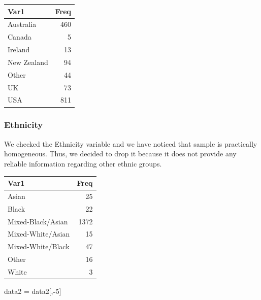 \documentclass[
]{article}
\newenvironment{Shaded}{\begin{snugshade}}{\end{snugshade}}
\newcommand{\DecValTok}[1]{\textcolor[rgb]{0.00,0.00,0.81}{#1}}
\newcommand{\KeywordTok}[1]{\textcolor[rgb]{0.13,0.29,0.53}{\textbf{#1}}}
\newcommand{\NormalTok}[1]{#1}
\newcommand{\OperatorTok}[1]{\textcolor[rgb]{0.81,0.36,0.00}{\textbf{#1}}}
\newcommand{\StringTok}[1]{\textcolor[rgb]{0.31,0.60,0.02}{#1}}
\begin{document}
\begin{longtable}[]{@{}lr@{}}
\toprule
Var1 & Freq\tabularnewline
\midrule
\endhead
Australia & 460\tabularnewline
Canada & 5\tabularnewline
Ireland & 13\tabularnewline
New Zealand & 94\tabularnewline
Other & 44\tabularnewline
UK & 73\tabularnewline
USA & 811\tabularnewline
\bottomrule
\end{longtable}

\begin{Shaded}
\end{Shaded}

\hypertarget{ethnicity}{%
\subsubsection{Ethnicity}\label{ethnicity}}

We checked the Ethnicity variable and we have noticed that sample is
practically homogeneous. Thus, we decided to drop it because it does not
provide any reliable information regarding other ethnic groups.

\begin{Shaded}
\end{Shaded}

\begin{longtable}[]{@{}lr@{}}
\toprule
Var1 & Freq\tabularnewline
\midrule
\endhead
Asian & 25\tabularnewline
Black & 22\tabularnewline
Mixed-Black/Asian & 1372\tabularnewline
Mixed-White/Asian & 15\tabularnewline
Mixed-White/Black & 47\tabularnewline
Other & 16\tabularnewline
White & 3\tabularnewline
\bottomrule
\end{longtable}

\begin{Shaded}
\begin{Highlighting}[]
\NormalTok{data2 =}\StringTok{ }\NormalTok{data2[,}\OperatorTok{-}\DecValTok{5}\NormalTok{]}
\end{Highlighting}
\end{Shaded}
\end{document}
